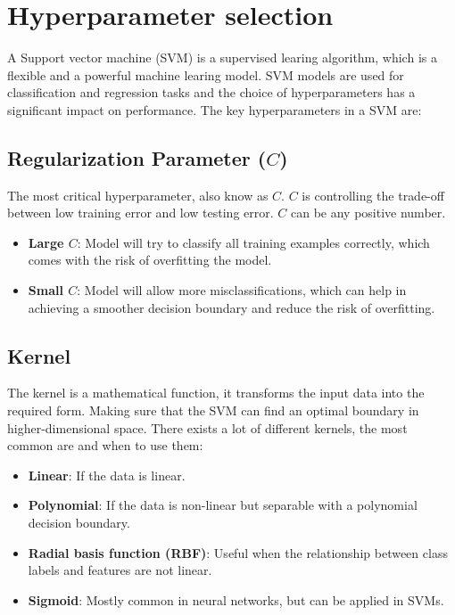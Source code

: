 \section{Hyperparameter selection}
A Support vector machine (SVM) is a supervised learing algorithm, which is a flexible and a powerful machine learing model.
SVM models are used for classification and regression tasks and the choice of hyperparameters has a significant impact on performance. The key hyperparameters in a SVM are:

\subsection{Regularization Parameter (\texorpdfstring{\(C\)}{C}) }
The most critical hyperparameter, also know as \(C\). \(C\) is controlling the trade-off between low training error and low testing error. 
 \(C\) can be any positive number. 
\begin{itemize}
    \item \textbf{Large \(C\)}: Model will try to classify all training examples correctly, which comes with the risk of overfitting the model.
    \item \textbf{Small \(C\)}: Model will allow more misclassifications, which can help in achieving a smoother decision boundary and reduce the risk of overfitting.
\end{itemize}

\subsection{Kernel}
The kernel is a mathematical function, it transforms the input data into the required form. Making sure that the SVM can find an optimal boundary in higher-dimensional space.
There exists a lot of different kernels, the most common are and when to use them:
\begin{itemize}
    \item \textbf{Linear}: If the data is linear. 
    \item \textbf{Polynomial}: If the data is non-linear but separable with a polynomial decision boundary.
    \item \textbf{Radial basis function (RBF)}: Useful when the relationship between class labels and features are not linear.
    \item \textbf{Sigmoid}: Mostly common in neural networks, but can be applied in SVMs.
\end{itemize}

